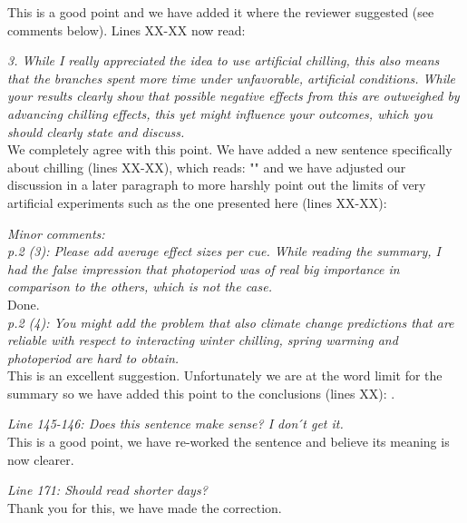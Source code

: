 \documentclass[11pt,a4paper]{article}
\begin{document}
This is a good point and we have added it where the reviewer suggested (see comments below). Lines XX-XX now read:

\begin{quote}
\end{quote}

\emph{3.  While I really appreciated the idea to use artificial chilling, this also means that
the branches spent more time under unfavorable, artificial conditions. While your results
clearly show that possible negative effects from this are outweighed by advancing chilling
effects, this yet might influence your outcomes, which you should clearly state and discuss.}\\

We completely agree with this point. We have added a new sentence specifically about chilling (lines XX-XX), which reads: "" and we have adjusted our discussion in a later paragraph to more harshly point out the limits of very artificial experiments such as the one presented here (lines XX-XX):

\begin{quote}
\end{quote}

\emph{Minor comments:\\
p.2 (3): Please add average effect sizes per cue. While reading the summary, I had the false
impression that photoperiod was of real big importance in comparison to the others, which is
not the case.}\\

Done.\\

\emph{p.2 (4): You might add the problem that also climate change predictions that are reliable
with respect to interacting winter chilling, spring warming and photoperiod are hard to
obtain.}\\

This is an excellent suggestion. Unfortunately we are at the word limit for the summary so we have added this point to the conclusions (lines XX): .

\emph{Line 145-146: Does this sentence make sense? I don ́t get it.}\\

This is a good point, we have re-worked the sentence and believe its meaning is now clearer. 

\emph{Line 171: Should read shorter days?}\\

Thank you for this, we have made the correction. 
\end{document}
